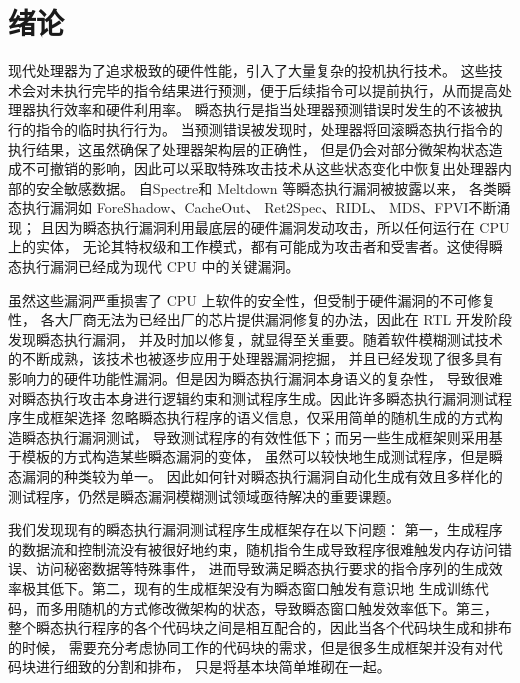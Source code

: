 \cleardoublepage

\section{绪论}

现代处理器为了追求极致的硬件性能，引入了大量复杂的投机执行技术\cite{gonzalez2010processor}。
这些技术会对未执行完毕的指令结果进行预测，便于后续指令可以提前执行，从而提高处理器执行效率和硬件利用率。
瞬态执行是指当处理器预测错误时发生的不该被执行的指令的临时执行行为。
当预测错误被发现时，处理器将回滚瞬态执行指令的执行结果，这虽然确保了处理器架构层的正确性，
但是仍会对部分微架构状态造成不可撤销的影响，因此可以采取特殊攻击技术从这些状态变化中恢复出处理器内部的安全敏感数据。
自Spectre\cite{kocher2020spectre}和 Meltdown\cite{horn2018meltdown} 等瞬态执行漏洞被披露以来，
各类瞬态执行漏洞如 ForeShadow\cite{van2018foreshadow}、CacheOut\cite{van2021cacheout}、
Ret2Spec\cite{maisuradze2018ret2spec}、RIDL\cite{mathure2023hardware}、
MDS\cite{minkin2019fallout}、FPVI\cite{ragab2021rage}不断涌现；
且因为瞬态执行漏洞利用最底层的硬件漏洞发动攻击，所以任何运行在 CPU 上的实体，
无论其特权级和工作模式，都有可能成为攻击者和受害者。这使得瞬态执行漏洞已经成为现代 CPU 中的关键漏洞。\par

虽然这些漏洞严重损害了 CPU 上软件的安全性，但受制于硬件漏洞的不可修复性，
各大厂商无法为已经出厂的芯片提供漏洞修复的办法，因此在 RTL 开发阶段发现瞬态执行漏洞，
并及时加以修复，就显得至关重要。随着软件模糊测试技术的不断成熟，该技术也被逐步应用于处理器漏洞挖掘，
并且已经发现了很多具有影响力的硬件功能性漏洞。但是因为瞬态执行漏洞本身语义的复杂性，
导致很难对瞬态执行攻击本身进行逻辑约束和测试程序生成。因此许多瞬态执行漏洞测试程序生成框架选择
忽略瞬态执行程序的语义信息，仅采用简单的随机生成的方式构造瞬态执行漏洞测试，
导致测试程序的有效性低下；而另一些生成框架则采用基于模板的方式构造某些瞬态漏洞的变体，
虽然可以较快地生成测试程序，但是瞬态漏洞的种类较为单一。
因此如何针对瞬态执行漏洞自动化生成有效且多样化的测试程序，仍然是瞬态漏洞模糊测试领域亟待解决的重要课题。\par

我们发现现有的瞬态执行漏洞测试程序生成框架存在以下问题：
第一，生成程序的数据流和控制流没有被很好地约束，随机指令生成导致程序很难触发内存访问错误、访问秘密数据等特殊事件，
进而导致满足瞬态执行要求的指令序列的生成效率极其低下。第二，现有的生成框架没有为瞬态窗口触发有意识地
生成训练代码，而多用随机的方式修改微架构的状态，导致瞬态窗口触发效率低下。第三，
整个瞬态执行程序的各个代码块之间是相互配合的，因此当各个代码块生成和排布的时候，
需要充分考虑协同工作的代码块的需求，但是很多生成框架并没有对代码块进行细致的分割和排布，
只是将基本块简单堆砌在一起。\par

